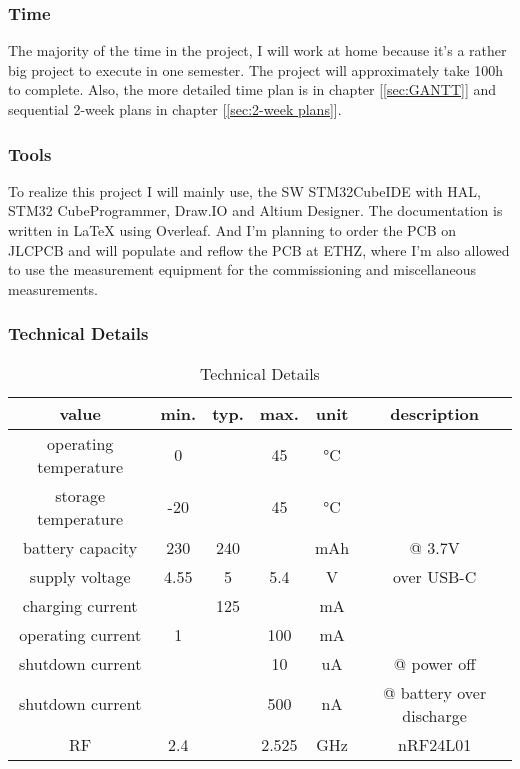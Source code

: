 \subsubsection{Time}
The majority of the time in the project, I will work at home because it's a rather big project to execute in one semester. The project will approximately take 100h to complete. Also, the more detailed time plan is in chapter [\ref{sec:GANTT}] and sequential 2-week plans in chapter [\ref{sec:2-week plans}].

\subsubsection{Tools}
To realize this project I will mainly use, the SW STM32CubeIDE with HAL, STM32 CubeProgrammer, Draw.IO and Altium Designer. The documentation is written in LaTeX using Overleaf. And I'm planning to order the PCB on JLCPCB and will populate and reflow the PCB at ETHZ, where I'm also allowed to use the measurement equipment for the commissioning and miscellaneous measurements.

\subsubsection{Technical Details}
\begin{table}[H]
    \centering
    \label{tab:Technical Details}
\begin{tabular}{||c || c | c | c | c  || c ||} 
 \hline
 value &  min. & typ. & max. & unit & description \\ [0.5ex] 
 \hline\hline
 operating temperature & 0 & & 45 & °C & \\ 
 \hline
storage temperature & -20 & & 45 & °C & \\ 
 \hline
  battery capacity & 230 & 240 & & mAh & @ 3.7V \\ 
 \hline
  supply voltage & 4.55 & 5 & 5.4 & V & over USB-C \\ 
 \hline
  charging current & & 125 & & mA & \\ 
 \hline
  operating current & 1 & & 100 & mA & \\ 
 \hline
  shutdown current & & & 10 & uA & @ power off \\ 
 \hline
  shutdown current & & & 500 & nA & @ battery over discharge \\ 
 \hline
  RF & 2.4 & & 2.525 & GHz & nRF24L01 \\ 
 \hline
\end{tabular}
    \caption{Technical Details}
\end{table}

\newpage